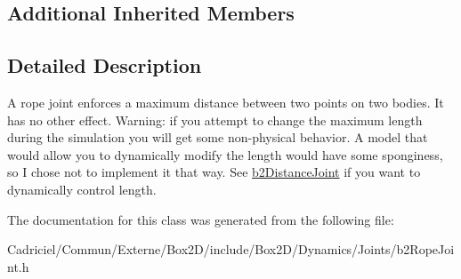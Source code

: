 \subsection*{Additional Inherited Members}


\subsection{Detailed Description}
A rope joint enforces a maximum distance between two points on two bodies. It has no other effect. Warning\+: if you attempt to change the maximum length during the simulation you will get some non-\/physical behavior. A model that would allow you to dynamically modify the length would have some sponginess, so I chose not to implement it that way. See \hyperlink{classb2_distance_joint}{b2\+Distance\+Joint} if you want to dynamically control length. 

The documentation for this class was generated from the following file\+:\begin{DoxyCompactItemize}
\item 
Cadriciel/\+Commun/\+Externe/\+Box2\+D/include/\+Box2\+D/\+Dynamics/\+Joints/b2\+Rope\+Joint.\+h\end{DoxyCompactItemize}
